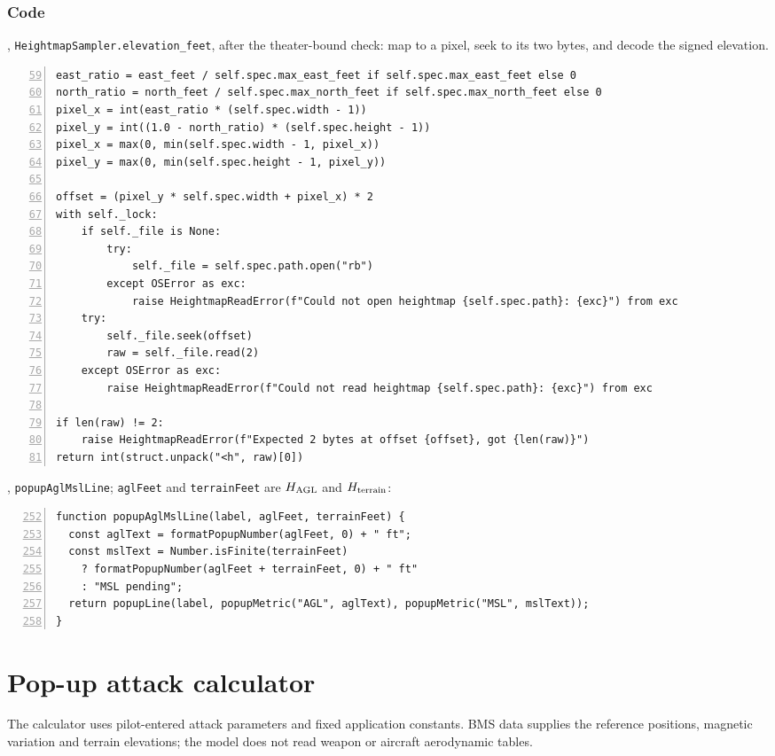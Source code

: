 \documentclass[10pt,a4paper]{amsart}
\begin{document}
\subsubsection*{Code}
, \texttt{HeightmapSampler.elevation\_feet},
after the theater-bound check: map to a pixel, seek to its two bytes,
and decode the signed elevation.
\begin{lstlisting}[numbers=left,firstnumber=59,numberstyle=\tiny,xleftmargin=2em]
east_ratio = east_feet / self.spec.max_east_feet if self.spec.max_east_feet else 0
north_ratio = north_feet / self.spec.max_north_feet if self.spec.max_north_feet else 0
pixel_x = int(east_ratio * (self.spec.width - 1))
pixel_y = int((1.0 - north_ratio) * (self.spec.height - 1))
pixel_x = max(0, min(self.spec.width - 1, pixel_x))
pixel_y = max(0, min(self.spec.height - 1, pixel_y))

offset = (pixel_y * self.spec.width + pixel_x) * 2
with self._lock:
    if self._file is None:
        try:
            self._file = self.spec.path.open("rb")
        except OSError as exc:
            raise HeightmapReadError(f"Could not open heightmap {self.spec.path}: {exc}") from exc
    try:
        self._file.seek(offset)
        raw = self._file.read(2)
    except OSError as exc:
        raise HeightmapReadError(f"Could not read heightmap {self.spec.path}: {exc}") from exc

if len(raw) != 2:
    raise HeightmapReadError(f"Expected 2 bytes at offset {offset}, got {len(raw)}")
return int(struct.unpack("<h", raw)[0])
\end{lstlisting}

, \texttt{popupAglMslLine};
\texttt{aglFeet} and \texttt{terrainFeet} are $H_{\rm AGL}$ and
$H_{\rm terrain}$:
\begin{lstlisting}[numbers=left,firstnumber=252,numberstyle=\tiny,xleftmargin=2em]
function popupAglMslLine(label, aglFeet, terrainFeet) {
  const aglText = formatPopupNumber(aglFeet, 0) + " ft";
  const mslText = Number.isFinite(terrainFeet)
    ? formatPopupNumber(aglFeet + terrainFeet, 0) + " ft"
    : "MSL pending";
  return popupLine(label, popupMetric("AGL", aglText), popupMetric("MSL", mslText));
}
\end{lstlisting}


\section{Pop-up attack calculator}\label{sec:popup}
The calculator uses pilot-entered attack parameters and fixed application
constants. BMS data supplies the reference positions, magnetic variation
and terrain elevations; the model does not read weapon or aircraft
aerodynamic tables.
\end{document}
